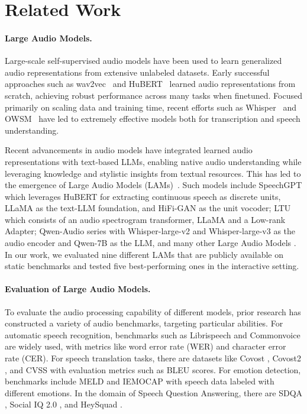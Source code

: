 \section{Related Work}
\paragraph{Large Audio Models.} Large-scale self-supervised audio models have been used to learn generalized audio representations from extensive unlabeled datasets. Early successful approaches such as wav2vec~\citep{schneider2019wav2vec} and  HuBERT~\citep{hsu2021hubert} learned audio representations from scratch, achieving robust performance across many tasks when finetuned. Focused primarily on scaling data and training time, recent efforts such as Whisper~\citep{radford2022whisper} and OWSM~\citep{owsm} have led to extremely effective models both for transcription and speech understanding.

Recent advancements in audio models have integrated learned audio representations with text-based LLMs, enabling native audio understanding while leveraging knowledge and stylistic insights from textual resources. This has led to the emergence of Large Audio Models (LAMs)~\citep{latif2023sparks}. Such models include SpeechGPT \citep{zhang2023speechgpt} which leverages HuBERT \citep{hsu2021hubert} for extracting continuous speech as discrete units, LLaMA \citep{touvron2023llama} as the text-LLM foundation, and HiFi-GAN \citep{kong2020hifi} as the unit vocoder; LTU \citep{gong2023listen} which consists of an audio spectrogram transformer, LLaMA and a Low-rank Adapter; Qwen-Audio series \citep{chu2023qwen, chu2024qwen2} with Whisper-large-v2 and Whisper-large-v3 as the audio encoder and Qwen-7B as the LLM, and many other Large Audio Models \citep{borsos2023audiolm, liu2023audioldm, held2024distilling}. In our work, we evaluated nine different LAMs that are publicly available on static benchmarks and tested five best-performing ones in the interactive setting.

\paragraph{Evaluation of Large Audio Models.}
To evaluate the audio processing capability of different models, prior research has constructed a variety of audio benchmarks, targeting particular abilities. For automatic speech recognition, benchmarks such as Librispeech \citep{panayotov2015librispeech} and Commonvoice \citep{ardila2019common} are widely used, with metrics like word error rate (WER) and character error rate (CER). For speech translation tasks, there are datasets like Covost \citep{wang2020covost}, Covost2 \citep{wang2021covost}, and CVSS \citep{jia2022cvss} with evaluation metrics such as BLEU scores. For emotion detection, benchmarks include MELD \citep{poria2018meld} and IEMOCAP \citep{busso2008iemocap} with speech data labeled with different emotions. In the domain of Speech Question Answering, there are SDQA \citep{faisal2021sd}, Social IQ 2.0 \citep{siq2}, and HeySquad \citep{wu2023heysquad}.

